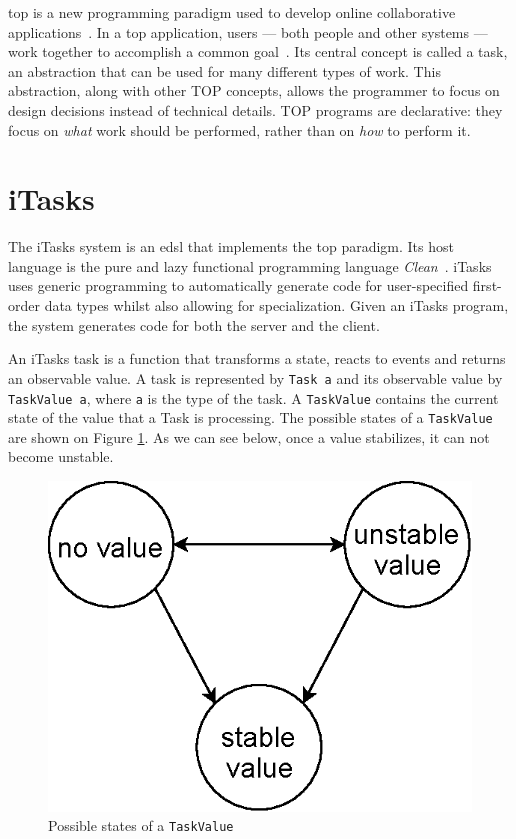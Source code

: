 \acf{top} is a new programming paradigm used to develop online collaborative applications~\cite{top}. In a \acs{top} application, users --- both people and other systems --- work together to accomplish a common goal~\cite{top}. Its central concept is called a task, an abstraction that can be used for many different types of work. This abstraction, along with other TOP concepts, allows the programmer to focus on design decisions instead of technical details. TOP programs are declarative: they focus on \textit{what} work should be performed, rather than on \textit{how} to perform it.

\section{iTasks}\label{itasks}
The iTasks system is an \acs{edsl} that implements the \acs{top} paradigm. Its host language is the pure and lazy functional programming language \textit{Clean}~\cite{clean}. iTasks uses generic programming to automatically generate code for user-specified first-order data types whilst also allowing for specialization. Given an iTasks program, the system generates code for both the server and the client.

An iTasks task is a function that transforms a state, reacts to events and returns an observable value. A task is represented by \texttt{Task a} and its observable value by \texttt{TaskValue a}, where \texttt{a} is the type of the task. A \texttt{TaskValue} contains the current state of the value that a Task is processing. The possible states of a \texttt{TaskValue} are shown on Figure \ref{fig:task_value}. As we can see below, once a value stabilizes, it can not become unstable.


\begin{figure}[H]
\begin{center}
\includegraphics[scale=0.7]{thesis/img/task_value.eps}
\end{center}
\caption{Possible states of a \texttt{TaskValue}}
\label{fig:task_value}
\end{figure}

